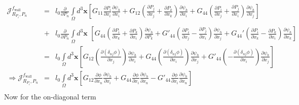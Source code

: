 \documentclass[16pt]{article} %
\begin{document}
\begin{eqnarray}\nonumber
\mathscr{J}_{R_{P_i},P_n}^{f_\mathrm{wall}} &=&l_0\frac{\partial}{\partial P_n} \int\limits_\Omega d^3 {\boldsymbol x} \left[G_{11} \frac{\partial P_i}{\partial x_i} \frac{\partial \psi_h}{\partial x_i} + G_{12} \left(\frac{\partial P_j}{\partial x_j} + \frac{\partial P_k}{\partial x_k} \right) \frac{\partial \psi_h}{\partial x_i} + G_{44} \left(\frac{\partial P_i}{\partial x_j} + \frac{\partial P_j}{\partial x_i} \right)\frac{\partial \psi_h}{\partial x_j} \right]\\ \nonumber\\ \nonumber
&+&l_0 \frac{\partial}{\partial P_n} \int\limits_\Omega d^3 {\boldsymbol x} \,\,\left[ G_{44} \left(\frac{\partial P_i}{\partial x_k} + \frac{\partial P_k}{\partial x_i} \right) \frac{\partial \psi_h}{\partial P_k} + G'_{44} \left(\frac{\partial P_i}{\partial x_j}  - \frac{\partial P_j}{\partial x_i}\right) \frac{\partial \psi_h}{\partial x_j} + G_{44}' \left(\frac{\partial P_i}{\partial x_k} - \frac{\partial P_k}{\partial x_i} \right) \frac{\partial \psi_h}{\partial x_k}\right]\\ \nonumber
&=&l_0 \int\limits_\Omega d^3 {\boldsymbol x} \left[ G_{12} \left(\frac{\partial ( \delta_{nj} \phi )}{\partial x_j}  \right) \frac{\partial \psi_h}{\partial x_i} + G_{44} \left(\frac{\partial (\delta_{nj} \phi)}{\partial x_i} \right)\frac{\partial \psi_h}{\partial x_j}  + G'_{44} \left(- \frac{\partial (\delta_{nj} \phi)}{\partial x_i}\right) \frac{\partial \psi_h}{\partial x_j} \right]\\ \nonumber
\Rightarrow \mathscr{J}_{R_{P_i},P_n}^{f_\mathrm{wall}} &=&l_0 \int\limits_\Omega d^3 {\boldsymbol x} \left[ G_{12} \frac{\partial  \phi }{\partial x_n}  \frac{\partial \psi_h}{\partial x_i} + G_{44} \frac{\partial \phi}{\partial x_i} \frac{\partial \psi_h}{\partial x_n}  - G'_{44} \frac{\partial \phi}{\partial x_i} \frac{\partial \psi_h}{\partial x_n} \right]\\ \nonumber
\end{eqnarray}
%
Now for the on-diagonal term
%
\end{document}
